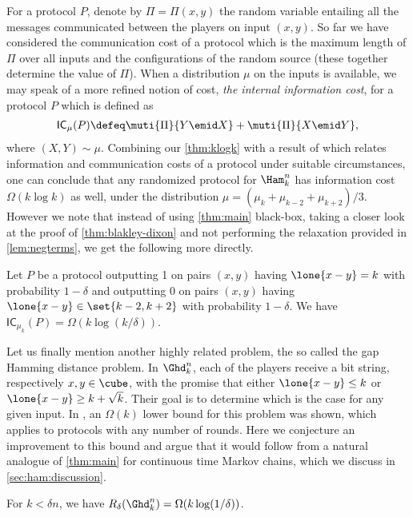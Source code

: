 For a protocol $P$, denote by $\Pi=\Pi(x,y)$ the random variable 
entailing all the messages communicated between the players 
on input $(x,y)$.
So far we have considered the communication cost of a protocol
which is the maximum length of $\Pi$ over all inputs and the 
configurations of the random source (these together determine 
the value of $\Pi$). When a distribution $\mu$
on the inputs is available, we may speak of
a more refined notion of cost, {\em the internal information cost}, 
for a protocol $P$ which is defined as
\begin{align*}
\mathsf{IC}_\mu(P)\defeq \muti{\Pi}{Y\emid X} + \muti{\Pi}{X\emid Y},
\end{align*}
where $(X,Y)\sim\mu$. Combining our 
\autoref{thm:klogk} with a result of \cite{KerenidisLLRX2015}
which relates information and communication costs of a protocol 
under suitable circumstances, one
can conclude that any randomized protocol for $\Ham^n_k$ has
information cost $\Omega(k\log k)$ as well, under the distribution
$\mu = (\mu_k+\mu_{k-2}+\mu_{k+2})/3$. However we note that instead 
of using \autoref{thm:main} black-box,
taking a closer look at the proof of \autoref{thm:blakley-dixon} 
and not performing the relaxation provided in \autoref{lem:negterms},
we get the following more directly.
\begin{theorem}
\label{thm:infocost}
Let $P$ be a protocol outputting 1 on pairs $(x,y)$ having
$\lone{x-y}=k$ with 
probability $1-\delta$ and outputting 0 on pairs 
$(x,y)$ having
$\lone{x-y}\in\set{k-2,k+2}$ with probability $1-\delta$. 
We have 
$\mathsf{IC}_{\mu_k}(P)=\Omega(k\log (k/\delta))$.
\end{theorem}

Let us finally mention another highly related problem, 
the so called the gap Hamming distance problem. 
In $\Ghd^n_{k}$, each of the players receive a bit string,
respectively $x,y\in\cube$, with the promise that either 
$\lone{x-y}\le k$ or $\lone{x-y}\ge k + \sqrt{k}$.
Their goal is to determine which is the case for any given input.
In \cite{ChakrabartiR2012}, an $\Omega(k)$ lower bound
for this problem was shown, which applies to protocols with any
number of rounds.
Here we conjecture an improvement to this bound
and argue that it would follow from a natural analogue of
\autoref{thm:main} for continuous time Markov chains, which
we discuss in \autoref{sec:ham:discussion}.
\begin{conjecture}
\label{conj:ghd}
For $k<\delta n$, we have $R_\delta(\Ghd^n_k) 
= \Omega(k \log(1/\delta))$.
\end{conjecture}

